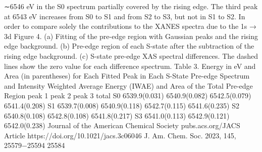 \documentclass{article}
\begin{document}
∼6546 eV in the S0 spectrum partially covered by the rising
edge. The third peak at 6543 eV increases from S0 to S1 and
from S2 to S3, but not in S1 to S2. In order to compare solely
the contributions to the XANES spectra due to the 1s → 3d
Figure 4. (a) Fitting of the pre-edge region with Gaussian peaks and the rising edge background. (b) Pre-edge region of each S-state after the
subtraction of the rising edge background. (c) S-state pre-edge XAS spectral differences. The dashed lines show the zero value for each difference
spectrum.
Table 3. Energy in eV and Area (in parentheses) for Each Fitted Peak in Each S-State Pre-edge Spectrum and Intensity
Weighted Average Energy (IWAE) and Area of the Total Pre-edge Region
peak 1
peak 2
peak 3
total
S0
6539.9(0.031)
6540.9(0.082)
6542.5(0.079)
6541.4(0.208)
S1
6539.7(0.008)
6540.9(0.118)
6542.7(0.115)
6541.6(0.235)
S2
6540.8(0.108)
6542.8(0.108)
6541.8(0.217)
S3
6541.0(0.113)
6542.9(0.121)
6542.0(0.238)
Journal of the American Chemical Society
pubs.acs.org/JACS
Article
https://doi.org/10.1021/jacs.3c06046
J. Am. Chem. Soc. 2023, 145, 25579−25594
25584

\newpage

\end{document}
